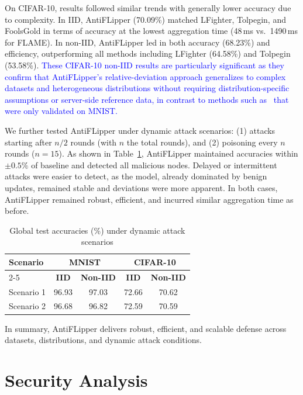 \documentclass[conference]{IEEEtran}
\begin{document}
On CIFAR-10, results followed similar trends with generally lower accuracy due to complexity. In IID, AntiFLipper (70.09\%) matched LFighter, Tolpegin, and FoolsGold in terms of accuracy at the lowest aggregation time (48\,ms vs.\ 1490\,ms for FLAME). In non-IID, AntiFLipper led in both accuracy (68.23\%) and efficiency, outperforming all methods including LFighter (64.58\%) and Tolpegin (53.58\%). \textcolor{blue}{These CIFAR-10 non-IID results are particularly significant as they confirm that AntiFLipper's relative-deviation approach generalizes to complex datasets and heterogeneous distributions without requiring distribution-specific assumptions or server-side reference data, in contrast to methods such as~\cite{li2023hscs,shen2024lfrppfl} that were only validated on MNIST.}

We further tested AntiFLipper under dynamic attack scenarios: (1) attacks starting after $n/2$ rounds (with $n$ the total rounds), and (2) poisoning every $n$ rounds ($n=15$). As shown in Table~\ref{table:dynamic_table}, AntiFLipper maintained accuracies within $\pm0.5\%$ of baseline and detected all malicious nodes. Delayed or intermittent attacks were easier to detect, as the model, already dominated by benign updates, remained stable and deviations were more apparent. In both cases, AntiFLipper remained robust, efficient, and incurred similar aggregation time as before.

\begin{table}[h]
\centering
\caption{Global test accuracies (\%) under dynamic attack scenarios}
\label{table:dynamic_table}
\begin{tabular}{|l||c|c|c|c|}
\hline
\textbf{Scenario} & \multicolumn{2}{c|}{\textbf{MNIST}} & \multicolumn{2}{c|}{\textbf{CIFAR-10}} \\
\cline{2-5}
 & \textbf{IID} & \textbf{Non-IID} & \textbf{IID} & \textbf{Non-IID} \\
\hline \hline
Scenario 1 & 96.93 & 97.03 & 72.66 & 70.62 \\ \hline
Scenario 2 & 96.68 & 96.82 & 72.59 & 70.59 \\
\hline
\end{tabular}
\end{table}

\noindent In summary, AntiFLipper delivers robust, efficient, and scalable defense across datasets, distributions, and dynamic attack conditions.


\section{Security Analysis}
\label{sec:securityanalysis}
\end{document}
